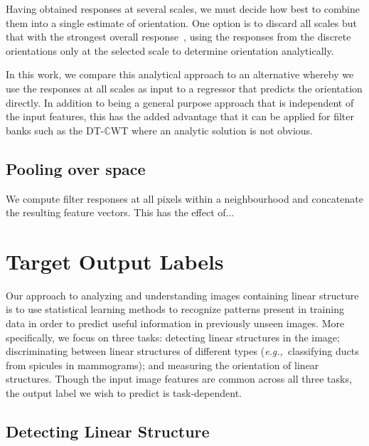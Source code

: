 \documentclass{IEEEtran}
\def\eg{\emph{e.g.,}}
\def\dtcwt{DT-$\mathbb{C}$WT}
\newcommand{\comment}[1]{}
\begin{document}
\comment{This is only relevant to orientation}
Having obtained responses at several scales, we must decide how best to combine them into a single estimate of orientation. One option is to discard all scales but that with the strongest overall response~\cite{Karssemeijer_teBrake_TMI96}, using the responses from the discrete orientations only at the selected scale to determine orientation analytically.


In this work, we compare this analytical approach to an alternative whereby we use the responses at all scales as input to a regressor that predicts the orientation directly. In addition to being a general purpose approach that is independent of the input features, this has the added advantage that it can be applied for filter banks such as the \dtcwt{} where an analytic solution is not obvious.

\subsection{Pooling over space}
We compute filter responses at all pixels within a neighbourhood and concatenate the resulting feature vectors. This has the effect of...



\clearpage
\section{Target Output Labels}
Our approach to analyzing and understanding images containing linear structure is to use statistical learning methods to recognize patterns present in training data in order to predict useful information in previously unseen images. More specifically, we focus on three tasks: detecting linear structures in the image; discriminating between linear structures of different types (\eg~classifying ducts from spicules in mammograms); and measuring the orientation of linear structures. Though the input image features are common across all three tasks, the output label we wish to predict is task-dependent.

\subsection{Detecting Linear Structure}

%
\end{document}
